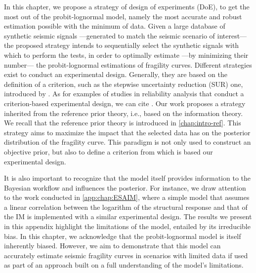 In this chapter, we propose a strategy of design of experiments (DoE), to get the most out of the probit-lognormal model, namely the most accurate and robust estimation possible with the minimum of data. Given a large database of synthetic seismic signals ---generated to match the seismic scenario of interest--- the proposed strategy intends to sequentially select the synthetic signals with which to perform 
the tests, in order to optimally estimate ---by minimizing their number--- the probit-lognormal estimations of fragility curves. 
Different strategies exist to conduct an experimental design. Generally, they are based on the definition of a criterion, such as the stepwise uncertainty reduction (SUR) one, introduced by \citet{bect_supermartingale_2019}. 
As for examples of studies in reliability analysis that conduct a criterion-based experimental design, we can cite \cite{azzimonti_adaptive_2021,agrell_sequential_2021,lartaud_sequential_2025}.
Our work proposes a strategy inherited from the reference prior theory, i.e., based on the information theory. We recall that the reference prior theory is introduced in \cref{chap:intro-ref}. This strategy aims to maximize the impact that the selected data has on the posterior distribution of the fragility curve. 
This paradigm is not only used to construct an objective prior, %
but also to define a criterion from which is based our experimental design.





It is also important to recognize that the model itself provides information to the Bayesian workflow and influences the posterior.
For instance, 
we draw attention to the work conducted in \cref{app:chap:ESAIM}, where a simple model that assumes a linear correlation between the logarithm of the structural response and that of the IM is implemented with a similar experimental design. The results we present in this appendix highlight the limitations of the model,  entailed by its irreducible bias. 
In this chapter, we acknowledge that the probit-lognormal model %
is itself inherently biased. However, we aim to demonstrate that this model can accurately estimate seismic fragility curves in scenarios with limited data if used as part of an approach built on a full understanding of the model's limitations.
%



